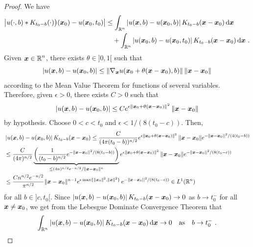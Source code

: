 \begin{proof}
We have
\begin{equation} \label{heat_unicD}
\begin{split}
\left| u(\cdot, b) \ast K_{t_0-b}(\cdot)\big)({\bm{x}}_0)
- u({\bm{x}}_0,t_0) \right|
&\leq \int_{\mathbb{R}^n} \left|u({\bm{x}},b) - u({\bm{x}}_0,b) \right|
K_{t_0-b}({\bm{x}}-{\bm{x}}_0) \,\mathrm{d}{{\bm{x}}} \\
&\quad + \int_{\mathbb{R}^n} \left|u({\bm{x}}_0,b) - u({\bm{x}}_0,t_0) \right|
K_{t_0-b}({\bm{x}}-{\bm{x}}_0) \,\mathrm{d}{{\bm{x}}} \ .
\end{split}
\end{equation}
Given $\displaystyle {\bm{x}} \in \mathbb{R}^n$, there exists
$\theta \in ]0,1[$ such that 
\[
\left|u({\bm{x}},b) - u({\bm{x}}_0,b) \right|
\leq \| \nabla_{{\bm{x}}} u( {\bm{x}}_0+\theta({\bm{x}}-{\bm{x}}_0),b)\|
\, \|{\bm{x}} - {\bm{x}}_0 \|
\]
according to the Mean Value Theorem for functions of several variables.
Therefore, given $\epsilon>0$, there exists $C>0$ such that
\[
\left|u({\bm{x}},b) - u({\bm{x}}_0,b) \right|
\leq C e^{\epsilon \|{\bm{x}}_0 + \theta ({\bm{x}}-{\bm{x}}_0)\|^2}\,
\|{\bm{x}}-{\bm{x}}_0\|
\]
by hypothesis.  Choose $0 < c < t_0$ and $\epsilon < 1/(8(t_0-c))$.  Then,
\begin{align*}
&\left|u({\bm{x}},b) - u({\bm{x}}_0,b) \right| K_{t_0-b}({\bm{x}}-{\bm{x}}_0)
\leq \frac{C}{(4\pi (t_0-b))^{n/2}}
e^{\epsilon \|{\bm{x}}_0 + \theta ({\bm{x}}-{\bm{x}}_0)\|^2}\, \|{\bm{x}}-{\bm{x}}_0\|
e^{-\|{\bm{x}}-{\bm{x}}_0||^2/(4(t_0-b))} \\
&\leq \frac{C}{(4\pi)^{n/2}}
\underbrace{\left(\frac{1}{(t_0-b)^{n/2}} e^{-\|{\bm{x}}-{\bm{x}}_0||^2/(8(t_0-b))}
\right)}_{\leq (4n)^{n/2} e^{-n/2} /\|{\bm{x}}-{\bm{x}}_0\|^n}
e^{\epsilon \|{\bm{x}}_0 + \theta ({\bm{x}}-{\bm{x}}_0)\|^2}\, \|{\bm{x}}-{\bm{x}}_0\|
e^{-\|{\bm{x}}-{\bm{x}}_0||^2/(8(t_0-c))} \\
&\leq \frac{C n^{n/2} e^{-n/2}}{\pi^{n/2}}
\|{\bm{x}}-{\bm{x}}_0\|^{n-1} e^{\epsilon \max \{\|{\bm{x}}_0\|^2,\|{\bm{x}}\|^2\}}\,
e^{-\|{\bm{x}}-{\bm{x}}_0||^2/(8(t_0-c))}  \in L^1(\mathbb{R}^n)
\end{align*}
for all $b \in ]c,t_0[$.  Since
$\displaystyle
\left|u({\bm{x}},b) - u({\bm{x}}_0,b) \right| K_{t_0-b}({\bm{x}}-{\bm{x}}_0)
\to 0$ as $b\to t_0^-$ for all ${\bm{x}} \neq {\bm{x}}_0$, we get from
the Lebesgue Dominate Convergence Theorem that
\begin{equation} \label{heat_unicE}
\int_{\mathbb{R}^n} \left|u({\bm{x}},b) - u({\bm{x}}_0,b) \right|
K_{t_0-b}({\bm{x}}-{\bm{x}}_0) \,\mathrm{d}{{\bm{x}}} \to 0
\quad \text{as} \quad b \to t_0^- \ .
\end{equation}


\end{proof}
